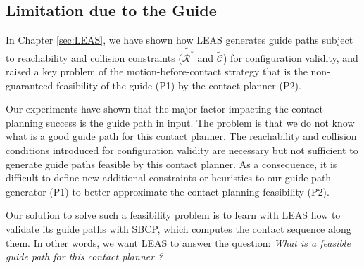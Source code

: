 \subsection{Limitation due to the Guide}

In Chapter \ref{sec:LEAS}, we have shown how LEAS generates guide paths subject to reachability and collision constraints ($\tilde{\mathcal{R}^*}$ and $\tilde{\mathcal{C}}$) for configuration validity, and raised a key problem of the motion-before-contact strategy that is the non-guaranteed feasibility of the guide (P1) by the contact planner (P2).

Our experiments have shown that the major factor impacting the contact planning success is the guide path in input.
The problem is that we do not know what is a good guide path for this contact planner. 
The reachability and collision conditions introduced for configuration validity are necessary but not sufficient to generate guide paths feasible by this contact planner. 
As a consequence, it is difficult to define new additional constraints or heuristics to our guide path generator (P1) to better approximate the contact planning feasibility (P2).

Our solution to solve such a feasibility problem is to learn with LEAS how to validate its guide paths with SBCP, which computes the contact sequence along them. In other words, we want LEAS to answer the question: \textit{What is a feasible guide path for this contact planner ?}





